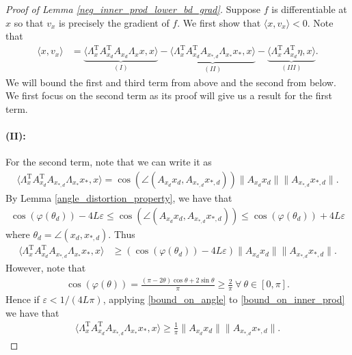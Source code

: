 \documentclass[11pt]{article}
\renewcommand{\epsilon}{\varepsilon}
\renewcommand{\top}{{\mathrm{T}}}
\theoremstyle{remark}
\begin{document}
\begin{proof}[Proof of Lemma \ref{neg_inner_prod_lower_bd_grad}] Suppose $f$ is differentiable at $x$ so that $v_x$ is precisely the gradient of $f$. We first show that $\langle x, v_x\rangle < 0$. Note that \begin{align}
\langle x,v_x \rangle & = \underbrace{\langle \Lambda_x^\top A_{x_d}^\top A_{x_d} \Lambda_x x,x \rangle}_{(I)} - \underbrace{\langle \Lambda_x^\top A_{x_d}^\top A_{x_{*,d}}\Lambda_{x_*}x_*,x \rangle}_{(II)} - \underbrace{\langle \Lambda_x^\top A_{x_d}^\top \eta,x\rangle}_{(III)}. \nonumber
\end{align} We will bound the first and third term from above and the second from below. We first focus on the second term as its proof will give us a result for the first term. 

\paragraph{(II):}For the second term, note that we can write it as \begin{align}
\langle \Lambda_x^\top A_{x_d}^\top A_{x_{*,d}}\Lambda_{x_*}x_*,x \rangle = \cos(\angle(A_{x_d}x_d,A_{x_{*,d}}x_{*,d}))\|A_{x_d}x_d\|\|A_{x_{*,d}}x_{*,d}\|. \nonumber
\end{align} By Lemma \ref{angle_distortion_property}, we have that \begin{align}
\cos(\varphi(\theta_d)) - 4L\epsilon \leqslant \cos(\angle(A_{x_d}x_d,A_{x_{*,d}}x_{*,d})) \leqslant \cos(\varphi(\theta_d)) + 4L\epsilon \nonumber
\end{align} where $\theta_d = \angle(x_d,x_{*,d})$. Thus \begin{align}
\langle \Lambda_x^\top A_{x_d}^\top A_{x_{*,d}}\Lambda_{x_*}x_*,x \rangle & \geqslant (\cos(\varphi(\theta_d))-4L \epsilon)\|A_{x_d}x_d\|\|A_{x_{*,d}}x_{*,d}\|. \label{bound_on_inner_prod}
\end{align} However, note that \begin{align}
\cos(\varphi(\theta)) = \frac{(\pi - 2\theta)\cos \theta + 2\sin \theta}{\pi} \geqslant \frac{2}{\pi}\ \forall\ \theta \in [0,\pi]. \label{bound_on_angle}
\end{align} Hence if $\epsilon < 1/(4L\pi)$, applying \eqref{bound_on_angle} to \eqref{bound_on_inner_prod} we have that
\begin{align}
\langle \Lambda_x^\top A_{x_d}^\top A_{x_{*,d}}\Lambda_{x_*}x_*,x \rangle \geqslant \frac{1}{\pi}\|A_{x_d}x_d\|\|A_{x_{*,d}}x_{*,d}\|. \label{inner_prod_lower_bound_w_pi}

\end{align}
\end{proof}
\end{document}
